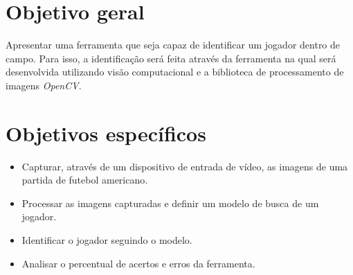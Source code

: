 \section{\textbf{{Objetivo geral}}}
Apresentar uma ferramenta que seja capaz de identificar um jogador dentro de campo. Para isso, a identificação será feita através da ferramenta na qual será desenvolvida utilizando visão computacional e a biblioteca de processamento de imagens \textit{OpenCV}. 


\section{\textbf{{Objetivos específicos}}}
 \begin{itemize}
   \item Capturar, através de um dispositivo de entrada de vídeo, as imagens de uma partida de futebol americano.
   
   \item Processar as imagens capturadas e definir um modelo de busca de um jogador.
   
   \item Identificar o jogador seguindo o modelo.
   
   \item Analisar o percentual de acertos e erros da ferramenta.
   
 \end{itemize}